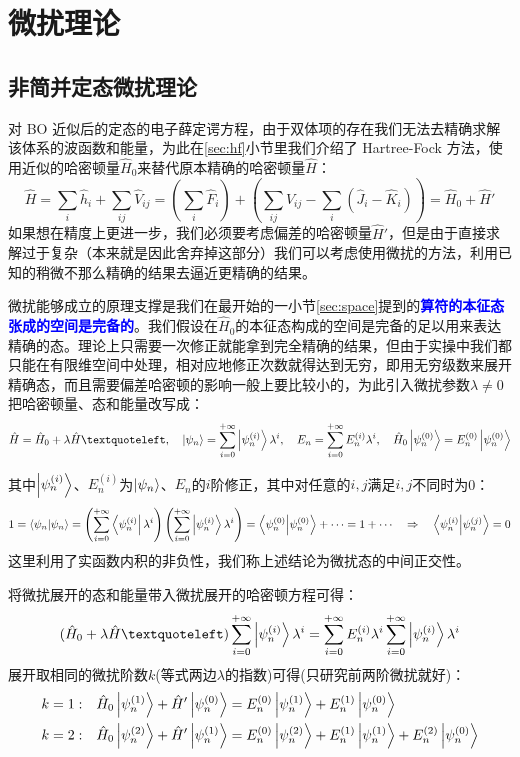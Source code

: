 \section{微扰理论}
\subsection{非简并定态微扰理论}
对 BO 近似后的定态的电子薛定谔方程，由于双体项的存在我们无法去精确求解该体系的波函数和能量，为此在\ref{sec:hf}小节里我们介绍了 Hartree-Fock 方法，使用近似的哈密顿量$\hat{H}_0$来替代原本精确的哈密顿量$\hat{H}$：
\[\hat{H}=\sum_{i}\hat{h}_i+\sum_{ij}\hat{V}_{ij}=\left(\sum_{i}\hat{F}_i\right)+\left(\sum_{ij}\hat{V}_{ij}-\sum_{i}(\hat{J}_i-\hat{K}_i)\right)=\hat{H}_0+\hat{H}'\]
如果想在精度上更进一步，我们必须要考虑偏差的哈密顿量$\hat{H}'$，但是由于直接求解过于复杂（本来就是因此舍弃掉这部分）我们可以考虑使用微扰的方法，利用已知的稍微不那么精确的结果去逼近更精确的结果。

微扰能够成立的原理支撑是我们在最开始的一小节\ref{sec:space}提到的\textcolor{blue}{\textbf{算符的本征态张成的空间是完备的}}。我们假设在$\hat{H}_0$的本征态构成的空间是完备的足以用来表达精确的态。理论上只需要一次修正就能拿到完全精确的结果，但由于实操中我们都只能在有限维空间中处理，相对应地修正次数就得达到无穷，即用无穷级数来展开精确态，而且需要偏差哈密顿的影响一般上要比较小的，为此引入微扰参数$\lambda\neq0$把哈密顿量、态和能量改写成：
\[\hat{H}=\hat{H}_0+\lambda\hat{H}‘, \quad \ket{\psi_n}=\sum_{i=0}^{+\infty}\ket{\psi_n^{(i)}}\lambda^i, \quad E_n=\sum_{i=0}^{+\infty}E_n^{(i)}\lambda^i, \quad \hat{H}_0\ket{\psi_n^{(0)}}=E_n^{(0)}\ket{\psi_n^{(0)}}\]

其中$\ket{\psi_n^{(i)}}$、$E_n^{(i)}$为$\ket{\psi_n}$、$E_n$的$i$阶修正，其中对任意的$i,j$满足$i,j$不同时为0：
\[1=\bra{\psi_n}\ket{\psi_n}=\left(\sum_{i=0}^{+\infty}\bra{\psi_n^{(i)}}\lambda^i\right)\left(\sum_{i=0}^{+\infty}\ket{\psi_n^{(i)}}\lambda^i\right)=\bra{\psi_n^{(0)}}\ket{\psi_n^{(0)}}+\cdots=1 +\cdots \quad \Rightarrow \quad \bra{\psi_n^{(i)}}\ket{\psi_n^{(j)}}=0\]
这里利用了实函数内积的非负性，我们称上述结论为微扰态的中间正交性。

将微扰展开的态和能量带入微扰展开的哈密顿方程可得：
\[(\hat{H}_0+\lambda\hat{H}‘)\sum_{i=0}^{+\infty}\ket{\psi_n^{(i)}}\lambda^i=\sum_{i=0}^{+\infty}E_n^{(i)}\lambda^i\sum_{i=0}^{+\infty}\ket{\psi_n^{(i)}}\lambda^i\]
展开取相同的微扰阶数$k$(等式两边$\lambda$的指数)可得(只研究前两阶微扰就好)：
\[\begin{aligned}
k=1: \quad & \hat{H}_0\ket{\psi_n^{(1)}}+\hat{H}'\ket{\psi_n^{(0)}}=E_n^{(0)}\ket{\psi_n^{(1)}}+E_n^{(1)}\ket{\psi_n^{(0)}}\\
k=2: \quad & \hat{H}_0\ket{\psi_n^{(2)}}+\hat{H}'\ket{\psi_n^{(1)}}=E_n^{(0)}\ket{\psi_n^{(2)}}+E_n^{(1)}\ket{\psi_n^{(1)}}+E_n^{(2)}\ket{\psi_n^{(0)}}
\end{aligned}\]

